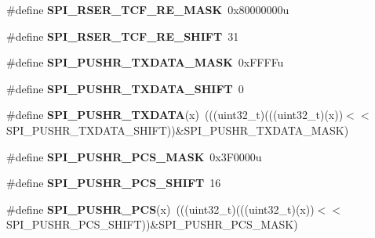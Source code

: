 \begin{DoxyCompactItemize}
\item 
\#define {\bfseries S\+P\+I\+\_\+\+R\+S\+E\+R\+\_\+\+T\+C\+F\+\_\+\+R\+E\+\_\+\+M\+A\+SK}~0x80000000u\hypertarget{group__SPI__Register__Masks_ga51ba97f1d47ebd36d19c5a634ce96873}{}\label{group__SPI__Register__Masks_ga51ba97f1d47ebd36d19c5a634ce96873}

\item 
\#define {\bfseries S\+P\+I\+\_\+\+R\+S\+E\+R\+\_\+\+T\+C\+F\+\_\+\+R\+E\+\_\+\+S\+H\+I\+FT}~31\hypertarget{group__SPI__Register__Masks_ga51740ce9a6d3a38cf50cb1f19af3d002}{}\label{group__SPI__Register__Masks_ga51740ce9a6d3a38cf50cb1f19af3d002}

\item 
\#define {\bfseries S\+P\+I\+\_\+\+P\+U\+S\+H\+R\+\_\+\+T\+X\+D\+A\+T\+A\+\_\+\+M\+A\+SK}~0x\+F\+F\+F\+Fu\hypertarget{group__SPI__Register__Masks_gac3651a6adad71c41138f88336e7711b4}{}\label{group__SPI__Register__Masks_gac3651a6adad71c41138f88336e7711b4}

\item 
\#define {\bfseries S\+P\+I\+\_\+\+P\+U\+S\+H\+R\+\_\+\+T\+X\+D\+A\+T\+A\+\_\+\+S\+H\+I\+FT}~0\hypertarget{group__SPI__Register__Masks_gac9778e35b8039b1268b42e16066a7812}{}\label{group__SPI__Register__Masks_gac9778e35b8039b1268b42e16066a7812}

\item 
\#define {\bfseries S\+P\+I\+\_\+\+P\+U\+S\+H\+R\+\_\+\+T\+X\+D\+A\+TA}(x)~(((uint32\+\_\+t)(((uint32\+\_\+t)(x))$<$$<$S\+P\+I\+\_\+\+P\+U\+S\+H\+R\+\_\+\+T\+X\+D\+A\+T\+A\+\_\+\+S\+H\+I\+FT))\&S\+P\+I\+\_\+\+P\+U\+S\+H\+R\+\_\+\+T\+X\+D\+A\+T\+A\+\_\+\+M\+A\+SK)\hypertarget{group__SPI__Register__Masks_gad19c7faf45531d7c7a6703a54ac2f69d}{}\label{group__SPI__Register__Masks_gad19c7faf45531d7c7a6703a54ac2f69d}

\item 
\#define {\bfseries S\+P\+I\+\_\+\+P\+U\+S\+H\+R\+\_\+\+P\+C\+S\+\_\+\+M\+A\+SK}~0x3\+F0000u\hypertarget{group__SPI__Register__Masks_gae2a7d0ea8a143281112074fe3745a70c}{}\label{group__SPI__Register__Masks_gae2a7d0ea8a143281112074fe3745a70c}

\item 
\#define {\bfseries S\+P\+I\+\_\+\+P\+U\+S\+H\+R\+\_\+\+P\+C\+S\+\_\+\+S\+H\+I\+FT}~16\hypertarget{group__SPI__Register__Masks_gafb0dfe436cd6273ce0b0052aca58499e}{}\label{group__SPI__Register__Masks_gafb0dfe436cd6273ce0b0052aca58499e}

\item 
\#define {\bfseries S\+P\+I\+\_\+\+P\+U\+S\+H\+R\+\_\+\+P\+CS}(x)~(((uint32\+\_\+t)(((uint32\+\_\+t)(x))$<$$<$S\+P\+I\+\_\+\+P\+U\+S\+H\+R\+\_\+\+P\+C\+S\+\_\+\+S\+H\+I\+FT))\&S\+P\+I\+\_\+\+P\+U\+S\+H\+R\+\_\+\+P\+C\+S\+\_\+\+M\+A\+SK)\hypertarget{group__SPI__Register__Masks_gad551a287ffb207f5d78c2ac04d393a9b}{}\label{group__SPI__Register__Masks_gad551a287ffb207f5d78c2ac04d393a9b}


\end{DoxyCompactItemize}

